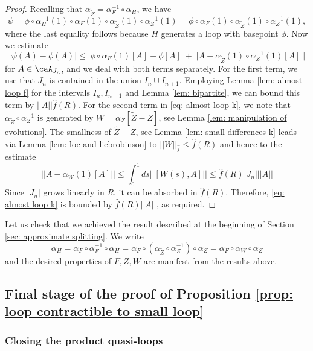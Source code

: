 \begin{proof}
	Recalling that $\alpha_{\widetilde Z}=\alpha_{F}^{-1} \circ \alpha_H$, we have
	$$\psi= \phi \circ \alpha_{H}^{-1}(1) \circ \alpha_{F}(1) \circ \alpha_{\widetilde Z}(1) \circ 
	\alpha_{Z}^{-1}(1)= \phi \circ \alpha_{F}(1) \circ \alpha_{\widetilde Z}(1) \circ 
	\alpha_{Z}^{-1}(1),
	$$
	where the last equality follows because $H$ generates a loop with basepoint $\phi$. 
	Now we estimate
	\begin{equation}\label{eq: almost loop k}
		|\psi(A)-\phi(A)| \leq    |\phi \circ \alpha_{F}(1)[A]-\phi[A]| +   ||  A- \alpha_{\widetilde Z}(1) \circ 
		\alpha_{Z}^{-1}(1)[A] ||
	\end{equation}
	for $A\in\caA_{J_n}$, and we deal with both terms separately. For the first term, we use that $J_n$ is contained in the union $I_n \cup I_{n+1}$. Employing Lemma  \ref{lem: almost loop f} for the intervals $I_n,I_{n+1}$ and Lemma \ref{lem: bipartite}, we can bound this term by $||A || \hat{f}(R)$.
	For the second term in \eqref{eq: almost loop k}, we note that $\alpha_{\widetilde Z} \circ 
	\alpha_{Z}^{-1}$ is generated by $W= \alpha_Z[\widetilde Z - Z]$, see Lemma \ref{lem: manipulation of evolutions}. The smallness of $\widetilde Z - Z$, see Lemma 
	\ref{lem: small differences k} leads via Lemma \ref{lem: loc and liebrobinson} to  $||W||_{\hat{f}}\leq \hat{f}(R)$ and hence  to the estimate
	$$
	||  A- \alpha_{W}(1)[A] || \leq \int_0^1 ds  ||  [W(s), A]||  \leq    \hat{f}(R)  |J_n| || A ||
	$$
	Since $|J_n|$ grows linearly in $R$, it can be absorbed in $\hat{f}(R)$. Therefore, \eqref{eq: almost loop k} is bounded by $\hat{f}(R) ||A||$, as required. 
\end{proof}

Let us check that we achieved the result described at the beginning of Section \ref{sec: approximate splitting}. We write
$$
\alpha_H=   \alpha_{F} \circ  \alpha_{F}^{-1} \circ \alpha_H = \alpha_{F} \circ  \left(\alpha_{\widetilde Z} \circ \alpha^{-1}_Z\right) \circ \alpha_Z =  \alpha_{F} \circ  \alpha_{W} \circ \alpha_Z
$$ 
and the desired properties of  $F,Z,W$ are manifest from the results above. 




\subsection{Final stage of the proof of Proposition \ref{prop: loop contractible to small loop}} \label{sec: final stage proof}


\subsubsection{Closing the product quasi-loops}

